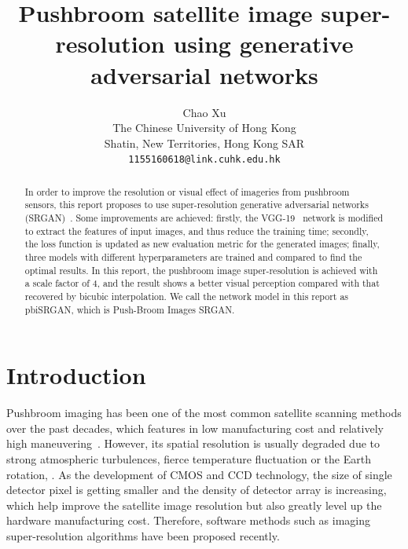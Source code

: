\documentclass[10pt,twocolumn,letterpaper]{article}
\begin{document}
\title{Pushbroom satellite image super-resolution using generative adversarial networks}

\author{Chao Xu\\
The Chinese University of Hong Kong\\
Shatin, New Territories, Hong Kong SAR\\
{\tt\small 1155160618@link.cuhk.edu.hk}
}
\maketitle

\begin{abstract}
In order to improve the resolution or visual effect of imageries from pushbroom sensors, this report proposes to use super-resolution generative adversarial networks (SRGAN)~\cite{ledig2017photo}. Some improvements are achieved: firstly, the VGG-19~\cite{simonyan2014very} network is modified to extract the features of input images, and thus reduce the training time; secondly, the loss function is updated as new evaluation metric for the generated images; finally, three models with different hyperparameters are trained and compared to find the optimal results. In this report,  the pushbroom image super-resolution is achieved with a scale factor of 4, and the result shows a better visual perception compared with that recovered by bicubic interpolation. We call the network model in this report as pbiSRGAN, which is Push-Broom Images SRGAN.         
\end{abstract}

\section{Introduction}
Pushbroom imaging has been one of the most common satellite scanning methods over the past decades, which features in low manufacturing cost and relatively high maneuvering~\cite{chao2020study}.  However, its spatial resolution is usually degraded due to strong atmospheric turbulences, fierce temperature fluctuation or the Earth rotation, \etal. As the development of CMOS and CCD technology, the size of single detector pixel is getting smaller and the density of detector array is increasing, which help improve the satellite image resolution but also greatly level up the hardware manufacturing cost. Therefore, software methods such as imaging super-resolution algorithms have been proposed recently.
\end{document}
